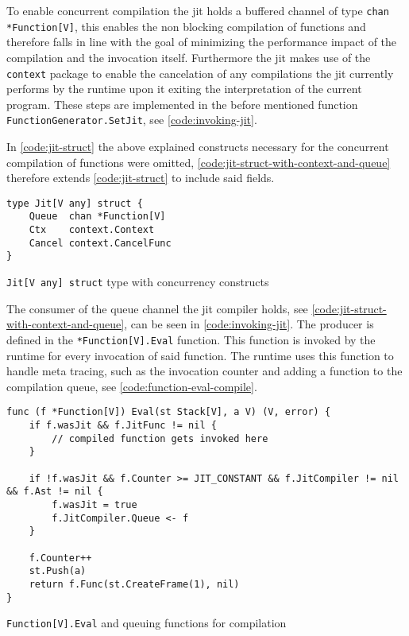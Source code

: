 To enable concurrent compilation the jit holds a buffered channel of type
\texttt{chan *Function[V]}, this enables the non blocking compilation
of functions and therefore falls in line with the goal of minimizing the
performance impact of the compilation and the invocation itself. Furthermore
the jit makes use of the \texttt{context} package to enable the cancelation of
any compilations the jit currently performs by the runtime upon it exiting the
interpretation of the current program. These steps are implemented in the
before mentioned function \texttt{FunctionGenerator.SetJit}, see
\autoref{code:invoking-jit}. 

In \autoref{code:jit-struct} the above explained constructs necessary for the
concurrent compilation of functions were omitted,
\autoref{code:jit-struct-with-context-and-queue} therefore extends
\autoref{code:jit-struct} to include said fields.

\begin{listing}[H]
    \begin{verbatim}
type Jit[V any] struct {
	Queue  chan *Function[V]
	Ctx    context.Context
	Cancel context.CancelFunc
}
    \end{verbatim}
    \caption{\texttt{Jit[V any] struct} type with concurrency constructs}
    \label{code:jit-struct-with-context-and-queue}
\end{listing}

The consumer of the queue channel the jit compiler holds, see
\autoref{code:jit-struct-with-context-and-queue}, can be seen in
\autoref{code:invoking-jit}. The producer is defined in the
\texttt{*Function[V].Eval} function. This function is invoked by the runtime
for every invocation of said function. The runtime uses this function to handle
meta tracing, such as the invocation counter and adding a function to the
compilation queue, see \autoref{code:function-eval-compile}.

\begin{listing}[H]
    \begin{verbatim}
func (f *Function[V]) Eval(st Stack[V], a V) (V, error) {
    if f.wasJit && f.JitFunc != nil {
        // compiled function gets invoked here
    }

    if !f.wasJit && f.Counter >= JIT_CONSTANT && f.JitCompiler != nil && f.Ast != nil {
        f.wasJit = true
        f.JitCompiler.Queue <- f
    }

    f.Counter++
    st.Push(a)
    return f.Func(st.CreateFrame(1), nil)
}

    \end{verbatim}
    \caption{\texttt{Function[V].Eval} and queuing functions for compilation}
    \label{code:function-eval-compile}
\end{listing}

